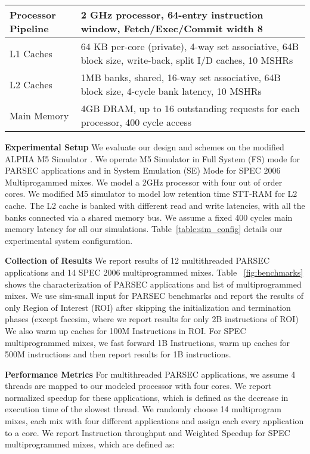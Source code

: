

\begin {table*} [t]
 \scriptsize
  \centering
 \caption {{\bf Baseline processor, cache, memory and configuration}} \label{table:sim_config}
 \begin{tabular}{|l|l|}
 \hline
Processor Pipeline & 2 GHz processor, 64-entry instruction window, Fetch/Exec/Commit width 8 \\
\hline
L1 Caches & 64 KB per-core (private), 4-way set associative, 64B block size, write-back, split I/D caches, 10 MSHRs \\
\hline
L2 Caches &  1MB banks, shared, 16-way set associative, 64B block size, 4-cycle bank latency, 10 MSHRs \\
\hline
Main Memory & 4GB DRAM, up to 16 outstanding requests for each processor, 400 cycle access \\
\hline
\end{tabular}
\end{table*}

\noindent\textbf{Experimental Setup}
We evaluate our design and schemes on the modified  ALPHA M5 Simulator \cite{} . We operate M5 Simulator in Full System (FS) mode for PARSEC applications and in System Emulation (SE) Mode for SPEC 2006 Multiprogammed mixes. We model a 2GHz processor with four out of order cores. We modified M5  simulator to model low retention time STT-RAM for L2 cache. The L2 cache  is banked with different read and write latencies, with all the banks connected via a shared memory bus. We assume a fixed 400 cycles main memory latency for all our simulations. Table~\ref{table:sim_config} details our experimental system configuration. 

\noindent\textbf{Collection of Results}
We report results of 12 multithreaded PARSEC applications and 14 SPEC 2006  multiprogrammed mixes. Table ~\ref{fig:benchmarks} shows the characterization of PARSEC applications and list of multiprogrammed mixes.
We use sim-small input for PARSEC benchmarks and report the results of only Region of Interest (ROI) after skipping the initialization and termination phases (except facesim, where we report results for only 2B instructions of ROI) We also warm up caches for 100M Instructions in ROI. For SPEC multiprogrammed mixes, we fast forward 1B Instructions, warm up caches for 500M instructions and then report results for 1B instructions. 

\noindent\textbf{Performance Metrics}
For multithreaded PARSEC applications, we assume 4 threads are mapped to our modeled processor with four cores. We report normalized speedup for these applications, which is defined as the decrease in execution time of the slowest thread. We randomly choose 14 multiprogram mixes, each mix with four different applications and assign each every application to a core. 
We report Instruction throughput and Weighted Speedup for SPEC multiprogrammed mixes, which are defined as:

